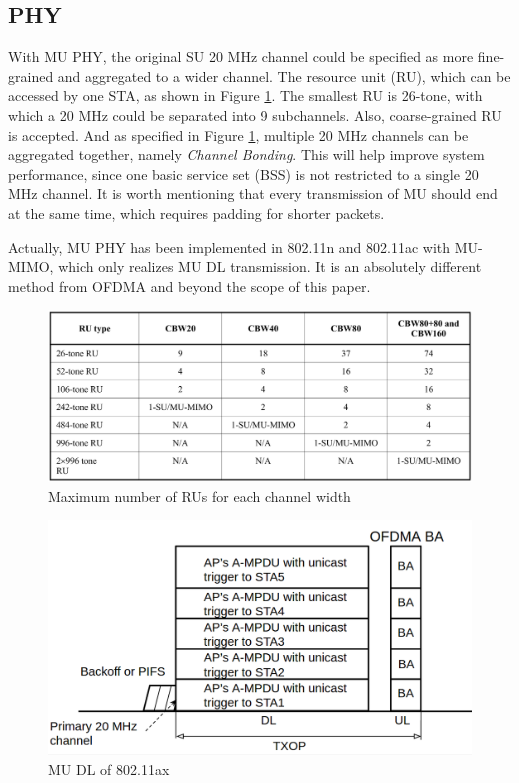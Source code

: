 \documentclass[journal]{IEEEtran}
\begin{document}
\subsection{PHY}
With MU PHY, the original SU 20 MHz channel could be specified as more fine-grained and aggregated to a wider channel.
The resource unit (RU), which can be accessed by one STA, as shown in Figure \ref{fig_RU_spec}. The smallest RU is 26-tone, with which a 20 MHz could be separated into 9 subchannels.
Also, coarse-grained RU is accepted.
And as specified in Figure \ref{fig_RU_spec}, multiple 20 MHz channels can be aggregated together, namely \textit{Channel Bonding}. 
This will help improve system performance, since one basic service set (BSS) is not restricted to a single 20 MHz channel.  
It is worth mentioning that every transmission of MU should end at the same time, which requires padding for shorter packets.



Actually, MU PHY has been implemented in 802.11n and 802.11ac with MU-MIMO, which only realizes MU DL transmission.
It is an absolutely different method from OFDMA and beyond the scope of this paper. 

\begin{figure}[!t]
\includegraphics[scale=0.14]{./figure/RU_spec.jpg}
\caption{Maximum number of RUs for each channel width}
\label{fig_RU_spec}
\end{figure}


\begin{figure}[!t]
\includegraphics[scale=0.23]{./figure/fig_MU_DL.png}
\caption{MU DL of 802.11ax}
\label{fig_MU_DL}
\end{figure}
\end{document}
